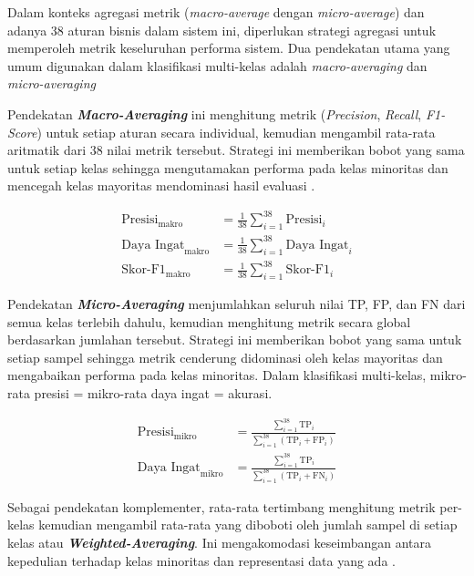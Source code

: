 Dalam konteks agregasi metrik (\textit{macro-average} dengan \textit{micro-average}) dan adanya 38 aturan bisnis dalam sistem ini, diperlukan strategi agregasi untuk memperoleh metrik keseluruhan performa sistem. Dua pendekatan utama yang umum digunakan dalam klasifikasi multi-kelas adalah \textit{macro-averaging} dan \textit{micro-averaging} \autocite{EvidentlyMultiClass}

Pendekatan \textbf{\textit{Macro-Averaging}} ini menghitung metrik (\textit{Precision}, \textit{Recall}, \textit{F1-Score}) untuk setiap aturan secara individual, kemudian mengambil rata-rata aritmatik dari 38 nilai metrik tersebut. Strategi ini memberikan bobot yang sama untuk setiap kelas sehingga mengutamakan performa pada kelas minoritas dan mencegah kelas mayoritas mendominasi hasil evaluasi \autocite{Grandini2020MultiClassMetrics}.

\label{sym:sum}
\begin{align}
\text{Presisi}_{\text{makro}} &= \frac{1}{38}\sum_{i=1}^{38} \text{Presisi}_i \\
\text{Daya Ingat}_{\text{makro}} &= \frac{1}{38}\sum_{i=1}^{38} \text{Daya Ingat}_i \\
\text{Skor-F1}_{\text{makro}} &= \frac{1}{38}\sum_{i=1}^{38} \text{Skor-F1}_i
\end{align}

Pendekatan \textbf{\textit{Micro-Averaging}} menjumlahkan seluruh nilai TP, FP, dan FN dari semua kelas terlebih dahulu, kemudian menghitung metrik secara global berdasarkan jumlahan tersebut. Strategi ini memberikan bobot yang sama untuk setiap sampel sehingga metrik cenderung didominasi oleh kelas mayoritas dan mengabaikan performa pada kelas minoritas. Dalam klasifikasi multi-kelas, mikro-rata presisi = mikro-rata daya ingat = akurasi\autocite{EvidentlyMultiClass}.

\begin{align}
\text{Presisi}_{\text{mikro}} &= \frac{\sum_{i=1}^{38} \text{TP}_i}{\sum_{i=1}^{38} (\text{TP}_i + \text{FP}_i)} \\
\text{Daya Ingat}_{\text{mikro}} &= \frac{\sum_{i=1}^{38} \text{TP}_i}{\sum_{i=1}^{38} (\text{TP}_i + \text{FN}_i)}
\end{align}

Sebagai pendekatan komplementer, rata-rata tertimbang menghitung metrik per-kelas kemudian mengambil rata-rata yang diboboti oleh jumlah sampel di setiap kelas atau \textbf{\textit{Weighted-Averaging}}. Ini mengakomodasi keseimbangan antara kepedulian terhadap kelas minoritas dan representasi data yang ada \autocite{Grandini2020MultiClassMetrics}.


